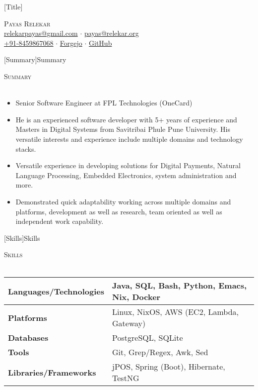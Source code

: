 \documentclass[a4paper]{article}
\newcommand{\lineunder} {
    \vspace*{-8pt} \\
    \hspace*{-18pt} \hrulefill \\
}
\newcommand{\header} [1] {
    {\hspace*{-18pt}\vspace*{6pt} \textsc{#1}}
    \vspace*{-6pt} \lineunder
}
\begin{document}
\vspace*{-40pt}

\vspace*{-10pt}
[Title]{}
\begin{center}
	{\Huge \scshape {Payas Relekar}}\\
	\href{mailto:relekarpayas@gmail.com}{relekarpayas@gmail.com} $\cdot$ \href{mailto:payas@relekar.org}{payas@relekar.org} \\
	\href{tel:+91-8459867068}{+91-8459867068} $\cdot$ \href{https://git.bhankas.org/payas/}{Forgejo} $\cdot$ \href{https://github.com/bhankas/}{GitHub}\\
\end{center}

[Summary]{Summary}
\header{Summary}
\vspace{1mm}

\begin{itemize} \itemsep 1pt
	\item Senior Software Engineer at FPL Technologies (OneCard)
    \item He is an experienced software developer with 5+ years of experience and Masters in Digital Systems from Savitribai Phule Pune University. His versatile interests and experience include multiple domains and technology stacks.
	\item Versatile experience in developing solutions for Digital Payments, Natural Language Processing, Embedded Electronics, system administration and more.
	\item Demonstrated quick adaptability working across multiple domains and platforms, development as well as research, team oriented as well as independent work capability.
\end{itemize}

[Skills]{Skills}
\header{Skills}
\vspace{1mm}
\bgroup
\setlength{\arrayrulewidth}{0.2mm}
\def\arraystretch{1.2}
\begin{tabularx}{\textwidth}{ | X | X | }
	\hline
	\textbf{Languages/Technologies} & Java, SQL, Bash, Python, Emacs, Nix, Docker \\
	\hline
	\textbf{Platforms}              & Linux, NixOS, AWS (EC2, Lambda, Gateway)    \\
	\hline
	\textbf{Databases}              & PostgreSQL, SQLite                          \\
	\hline
	\textbf{Tools}                  & Git, Grep/Regex, Awk, Sed                   \\
	\hline
	\textbf{Libraries/Frameworks}   & jPOS, Spring (Boot), Hibernate, TestNG      \\
	\hline
\end{tabularx}
\egroup
\vspace{2mm}
\end{document}
